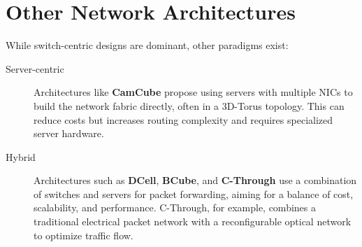 \section{Other Network Architectures}
While switch-centric designs are dominant, other paradigms exist:
\begin{description}
    \item[Server-centric] Architectures like \textbf{CamCube} propose using servers with multiple NICs to build the network fabric directly, often in a 3D-Torus topology. This can reduce costs but increases routing complexity and requires specialized server hardware.
    \item[Hybrid] Architectures such as \textbf{DCell}, \textbf{BCube}, and \textbf{C-Through} use a combination of switches and servers for packet forwarding, aiming for a balance of cost, scalability, and performance. C-Through, for example, combines a traditional electrical packet network with a reconfigurable optical network to optimize traffic flow.
\end{description}